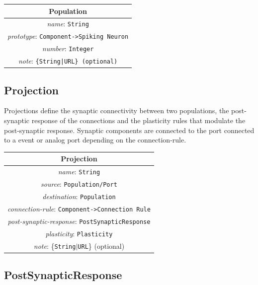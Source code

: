\documentclass[draftspec]{ninemlspec}
\begin{document}
\begin{table}[htb]
\center
\begin{tabular}{|c|}
\hline
\hline
Population \\
\hline
\hline
{\em name}: {\tt String} \\
\hline
{\em prototype}: {\tt Component->Spiking Neuron} \\
\hline
{\em number}: {\tt Integer}\\
\hline
{\em note}: {\tt \{String|URL\} (optional)} \\
\hline
\end{tabular}
\end{table}

\newpage

\subsection{Projection}
\label{projections}

Projections define the synaptic connectivity between two populations, the post-synaptic response of the connections and the plasticity rules that modulate the post-synaptic response. Synaptic components are connected to the port  connected to a event or analog port depending on the connection-rule.

\begin{table}[htb]
\center
\begin{tabular}{|c|}
\hline
\hline
Projection \\
\hline
\hline
{\em name}: {\tt String} \\
\hline
{\em source}: {\tt Population/Port} \\
\hline
{\em destination}: {\tt Population} \\
\hline
{\em connection-rule}: {\tt Component->Connection Rule} \\
\hline
{\em post-synaptic-response}: {\tt PostSynapticResponse} \\
\hline
{\em plasticity}: {\tt Plasticity} \\
\hline
{\em note}: \{{\tt String}$|${\tt URL}\} (optional)\\
\hline
\end{tabular}
\end{table}

\subsection{PostSynapticResponse}
\label{postsynapticresponse}
\end{document}
